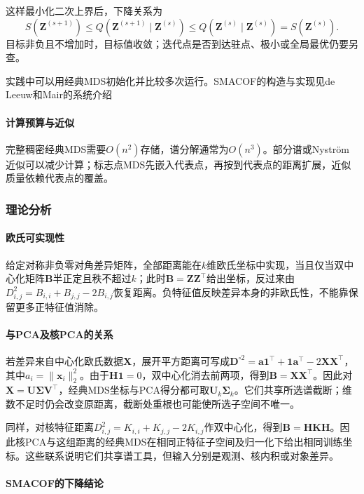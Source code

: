 这样最小化二次上界后，下降关系为
\[
  S(\bm{Z}^{(s+1)})
  \leq Q(\bm{Z}^{(s+1)}\mid\bm{Z}^{(s)})
  \leq Q(\bm{Z}^{(s)}\mid\bm{Z}^{(s)})
  =S(\bm{Z}^{(s)}).
\]
目标非负且不增加时，目标值收敛；迭代点是否到达驻点、极小或全局最优仍要另查。

实践中可以用经典MDS初始化并比较多次运行。SMACOF的构造与实现见de Leeuw和Mair的系统介绍

\paragraph{计算预算与近似}



完整稠密经典MDS需要$O(n^2)$存储，谱分解通常为$O(n^3)$。部分谱或Nystr\"om近似可以减少计算；标志点MDS先嵌入代表点，再按到代表点的距离扩展，近似质量依赖代表点的覆盖。

\subsubsection{理论分析}

\paragraph{欧氏可实现性}

给定对称非负零对角差异矩阵，全部距离能在$k$维欧氏坐标中实现，当且仅当双中心化矩阵$\bm B$半正定且秩不超过$k$；此时$\bm B=\bm Z\bm Z^\top$给出坐标，反过来由$D_{i,j}^2=B_{i,i}+B_{j,j}-2B_{i,j}$恢复距离。负特征值反映差异本身的非欧氏性，不能靠保留更多正特征值消除。

\paragraph{与PCA及核PCA的关系}

若差异来自中心化欧氏数据$\bm X$，展开平方距离可写成$\bm D^{\circ2}=\bm a\bm1^\top+\bm1\bm a^\top-2\bm X\bm X^\top$，其中$a_i=\lVert\bm x_i\rVert_2^2$。由于$\bm H\bm1=0$，双中心化消去前两项，得到$\bm B=\bm X\bm X^\top$。因此对$\bm X=\bm U\bm\Sigma\bm V^\top$，经典MDS坐标与PCA得分都可取$\bm U_k\bm\Sigma_k$。它们共享所选谱截断；维数不足时仍会改变原距离，截断处重根也可能使所选子空间不唯一。

同样，对核特征距离$D_{i,j}^2=K_{i,i}+K_{j,j}-2K_{i,j}$作双中心化，得到$\bm B=\bm H\bm K\bm H$。因此核PCA与这组距离的经典MDS在相同正特征子空间及归一化下给出相同训练坐标。这些联系说明它们共享谱工具，但输入分别是观测、核内积或对象差异。

\paragraph{SMACOF的下降结论}

